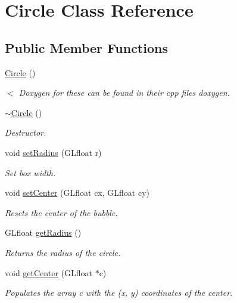 \hypertarget{class_circle}{}\section{Circle Class Reference}
\label{class_circle}
\subsection*{Public Member Functions}
\begin{DoxyCompactItemize}
\item 
\hyperlink{class_circle_ad1ecfcfc7bf34529c6a6d6c448bf70fe}{Circle} ()
\begin{DoxyCompactList}\small\item\em $<$ Doxygen for these can be found in their cpp file\textquotesingle{}s doxygen. \end{DoxyCompactList}\item 
\hyperlink{class_circle_ae3f30436e645d73e368e8ee55f8d1650}{$\sim$\+Circle} ()
\begin{DoxyCompactList}\small\item\em Destructor. \end{DoxyCompactList}\item 
void \hyperlink{class_circle_aff9da6b79474e41dd5fd20371f50569a}{set\+Radius} (G\+Lfloat r)
\begin{DoxyCompactList}\small\item\em Set box width. \end{DoxyCompactList}\item 
void \hyperlink{class_circle_a0551366b41fb5426823aa9386f3125f8}{set\+Center} (G\+Lfloat cx, G\+Lfloat cy)
\begin{DoxyCompactList}\small\item\em Resets the center of the bubble. \end{DoxyCompactList}\item 
\mbox{\label{class_circle_a007cf8fdd4c837ff9d5a92033857c3d7}} 
G\+Lfloat \hyperlink{class_circle_a007cf8fdd4c837ff9d5a92033857c3d7}{get\+Radius} ()
\begin{DoxyCompactList}\small\item\em Returns the radius of the circle. \end{DoxyCompactList}\item 
void \hyperlink{class_circle_a7c01c9166df7a3db41d4e394f18410bd}{get\+Center} (G\+Lfloat $\ast$c)
\begin{DoxyCompactList}\small\item\em Populates the array c with the (x, y) coordinates of the center. \end{DoxyCompactList}\item 

\end{DoxyCompactItemize}
